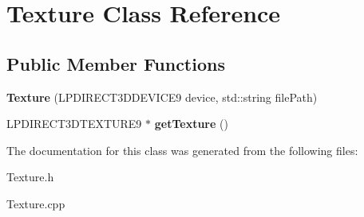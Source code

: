 \hypertarget{class_texture}{\section{Texture Class Reference}
\label{class_texture}
}
\subsection*{Public Member Functions}
\begin{DoxyCompactItemize}
\item 
\hypertarget{class_texture_a6ac6e9ca428ea8480dc2df25aa899ea6}{{\bfseries Texture} (L\-P\-D\-I\-R\-E\-C\-T3\-D\-D\-E\-V\-I\-C\-E9 device, std\-::string file\-Path)}\label{class_texture_a6ac6e9ca428ea8480dc2df25aa899ea6}

\item 
\hypertarget{class_texture_a787be115a42d428cffdb200806a350b1}{L\-P\-D\-I\-R\-E\-C\-T3\-D\-T\-E\-X\-T\-U\-R\-E9 $\ast$ {\bfseries get\-Texture} ()}\label{class_texture_a787be115a42d428cffdb200806a350b1}

\end{DoxyCompactItemize}


The documentation for this class was generated from the following files\-:\begin{DoxyCompactItemize}
\item 
Texture.\-h\item 
Texture.\-cpp\end{DoxyCompactItemize}

